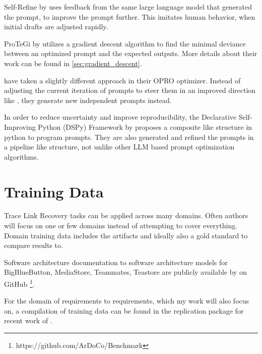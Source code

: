 Self-Refine by  uses feedback from the same large language model that generated the prompt, to improve the prompt further. This imitates human behavior, when initial drafts are adjusted rapidly. 

ProTeGi by  utilizes a gradient descent algorithm to find the minimal deviance between an optimized prompt and the expected outputs. More details about their work can be found in \ref{sec:gradient_descent}.

 have taken a slightly different approach in their OPRO optimizer. Instead of adjusting the current iteration of prompts to steer them in an improved direction like \citeauthor{pryzant2023AutomaticPrompt}, they generate new independent prompts instead.

In order to reduce uncertainty and improve reproducibility, the Declarative Self-Improving Python (DSPy) Framework by  proposes a composite like structure in python to program prompts. They are also generated and refined the prompts in a pipeline like structure, not unlike other LLM based prompt optimization algorithms. 

\section{Training Data}
Trace Link Recovery tasks can be applied across many domains. Often authors will focus on one or few domains instead of attempting to cover everything. Domain training data includes the artifacts and ideally also a gold standard to compare results to.

Software architecture documentation to software architecture models for BigBlueButton, MediaStore, Teammates, Teastore are publicly available by  on GitHub \footnote{https://github.com/ArDoCo/Benchmark}.

For the domain of requirements to requirements, which my work will also focus on, a compilation of training data can be found in the replication package\cite{hey2025ReplicationPackage} for recent work of \citeauthor{hey2025RequirementsTraceability}.